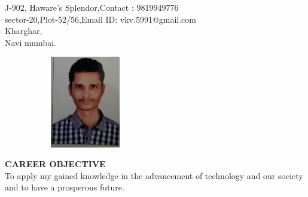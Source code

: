 \documentclass[a4paper]{article}
\begin{document}


\begin{flushleft}
{J-902, Haware's Splendor,\hfill{Contact : 9819949776} \\sector-20,Plot-52/56,\hfill{Email ID: vkv.5991@gmail.com}\\ Kharghar, \\Navi mumbai.}
\end{flushleft}


\begin{figure}[h]
\begin{flushright}
\graphicspath{ {images/} }
\includegraphics[width=5cm, height=4cm, angle = 270]{cv_pic}
\end{flushright}
\end{figure}


\begin{flushleft}
\textbf {CAREER OBJECTIVE}\\
To apply my gained knowledge in the advancement of technology and our society and to have a prosperous future.
\end{flushleft}
\end{document}
